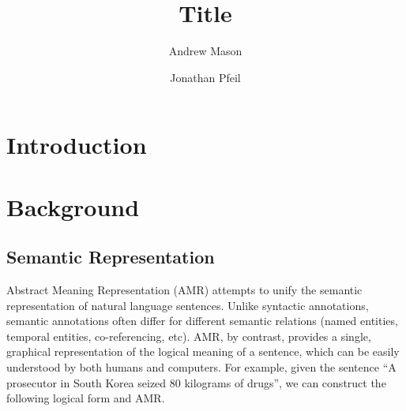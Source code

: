 \documentclass[12pt]{article}
\title{Title}
\author{Andrew Mason \and Jonathan Pfeil}
\begin{document}
\maketitle
\tableofcontents
\pagebreak

\section{Introduction}
\section{Background}
\subsection{Semantic Representation}

Abstract Meaning Representation (AMR)\cite{amr_sembank} attempts to unify the
semantic representation of natural language sentences. Unlike syntactic
annotations, semantic annotations often differ for different semantic relations
(named entities, temporal entities, co-referencing, etc). AMR, by contrast,
provides a single, graphical representation of the logical meaning of a
sentence, which can be easily understood by both humans and computers. For
example, given the sentence ``A prosecutor in South Korea seized 80 kilograms
of drugs'', we can construct the following logical form and AMR.\\
\end{document}
